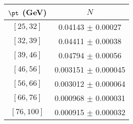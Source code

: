 \begin{tabular}{c||c}
$\pt$ (GeV) & $N$  \\
\hline
$[25, 32]$ & 0.04143 $\pm$ 0.00027\\
$[32, 39]$ & 0.04411 $\pm$ 0.00038\\
$[39, 46]$ & 0.04794 $\pm$ 0.00056\\
$[46, 56]$ & 0.003151 $\pm$ 0.000045\\
$[56, 66]$ & 0.003012 $\pm$ 0.000064\\
$[66, 76]$ & 0.000968 $\pm$ 0.000031\\
$[76, 100]$ & 0.000915 $\pm$ 0.000032\\
\end{tabular}
